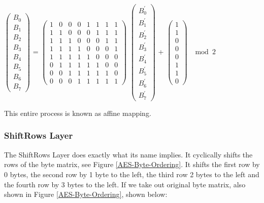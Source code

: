 \begin{center}
$
\begin{pmatrix}
B_0 \\
B_1 \\
B_2 \\
B_3 \\
B_4 \\
B_5 \\
B_6 \\
B_7
\end{pmatrix} 
$
=
$
\begin{pmatrix}
1&0&0&0&1&1&1&1\\
1&1&0&0&0&1&1&1\\
1&1&1&0&0&0&1&1\\
1&1&1&1&0&0&0&1\\
1&1&1&1&1&0&0&0\\
0&1&1&1&1&1&0&0\\
0&0&1&1&1&1&1&0\\
0&0&0&1&1&1&1&1
\end{pmatrix}
$
$
\begin{pmatrix}
B^{'}_0 \\
B^{'}_1 \\
B^{'}_2 \\
B^{'}_3 \\
B^{'}_4 \\
B^{'}_5 \\
B^{'}_6 \\
B^{'}_7
\end{pmatrix}
$
+
$
\begin{pmatrix}
1 \\
1 \\
0 \\
0 \\
0 \\
1 \\
1 \\
0
\end{pmatrix}
$
$\mod{2}$
\end{center}

This entire process is known as affine mapping.

\subsubsection{ShiftRows Layer}

The ShiftRows Layer does exactly what its name implies. It cyclically shifts the rows of the byte matrix, see Figure \ref{AES-Byte-Ordering}. It shifts the first row by 0 bytes, the second row by 1 byte to the left, the third row 2 bytes to the left and the fourth row by 3 bytes to the left. If we take out original byte matrix, also shown in Figure \ref{AES-Byte-Ordering}, shown below:

